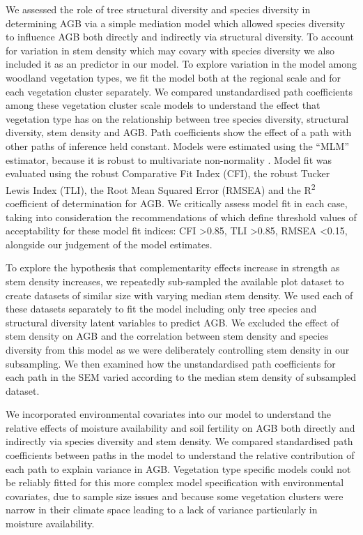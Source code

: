 \documentclass[11pt,a4paper]{article}
\begin{document}
We assessed the role of tree structural diversity and species diversity in determining AGB via a simple mediation model which allowed species diversity to influence AGB both directly and indirectly via structural diversity. To account for variation in stem density which may covary with species diversity we also included it as an predictor in our model. To explore variation in the model among woodland vegetation types, we fit the model both at the regional scale and for each vegetation cluster separately. We compared unstandardised path coefficients among these vegetation cluster scale models to understand the effect that vegetation type has on the relationship between tree species diversity, structural diversity, stem density and AGB. Path coefficients show the effect of a path with other paths of inference held constant. Models were estimated using the ``MLM'' estimator, because it is robust to multivariate non-normality \citep{Shapiro1983}. Model fit was evaluated using the robust Comparative Fit Index (CFI), the robust Tucker Lewis Index (TLI), the Root Mean Squared Error (RMSEA) and the R\textsuperscript{2} coefficient of determination for AGB. We critically assess model fit in each case, taking into consideration the recommendations of \citet{Hu1999} which define threshold values of acceptability for these model fit indices: CFI >0.85, TLI >0.85, RMSEA <0.15, alongside our judgement of the model estimates.

To explore the hypothesis that complementarity effects increase in strength as stem density increases, we repeatedly sub-sampled the available plot dataset to create \subn{} datasets of similar size with varying median stem density. We used each of these datasets separately to fit the model including only tree species and structural diversity latent variables to predict AGB. We excluded the effect of stem density on AGB and the correlation between stem density and species diversity from this model as we were deliberately controlling stem density in our subsampling. We then examined how the unstandardised path coefficients for each path in the SEM varied according to the median stem density of subsampled dataset.

We incorporated environmental covariates into our model to understand the relative effects of moisture availability and soil fertility on AGB both directly and indirectly via species diversity and stem density. We compared standardised path coefficients between paths in the model to understand the relative contribution of each path to explain variance in AGB. Vegetation type specific models could not be reliably fitted for this more complex model specification with environmental covariates, due to sample size issues and because some vegetation clusters were narrow in their climate space leading to a lack of variance particularly in moisture availability.
\end{document}
